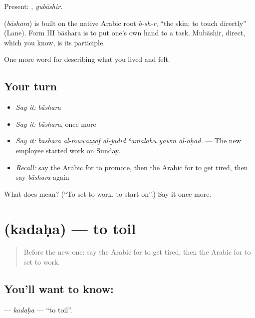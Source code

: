 Present: , \emph{yubāshir}.

\begin{cousinweb}
\textbf{} (\emph{bāshara}) is built on the native Arabic root \emph{b-sh-r}, \textquotedblleft{}the skin; to touch directly\textquotedblright{} (Lane). Form III bāshara is to put one's own hand to a task. Mubāshir, direct, which you know, is its participle.
\end{cousinweb}

\begin{grammarlens}[title={What you've built}]
One more word for describing what you lived and felt.
\end{grammarlens}

\subsection*{Your turn}
\begin{itemize}
\raggedright
  \item \emph{Say it:} \emph{bāshara}
  \item \emph{Say it:} \emph{bāshara}, once more
  \item \emph{Say it:} \emph{bāshara al-muwaẓẓaf al-jadīd ʿamalahu yawm al-aḥad.} — The new employee started work on Sunday.
  \item \emph{Recall:} say the Arabic for to promote, then the Arabic for to get tired, then say \emph{bāshara} again
\end{itemize}

\begin{tcolorbox}[breakable,colback=teal!4,colframe=teal!35!black,title={Before you move on}]
What does  mean? (\textquotedblleft{}To set to work, to start on\textquotedblright{}.) Say it once more.
\end{tcolorbox}
\section[\texorpdfstring{\ar{كدح} (kadaḥa)}{كدح (kadaḥa)}]{ (kadaḥa) — to toil}

\label{lesson:AR-C522-kadaha}



\begin{quote}
Before the new one: say the Arabic for to get tired, then the Arabic for to set to work.
\end{quote}

\subsection*{You'll want to know: }
\textbf{} — \emph{kadaḥa} — \textquotedblleft{}to toil\textquotedblright{}.

